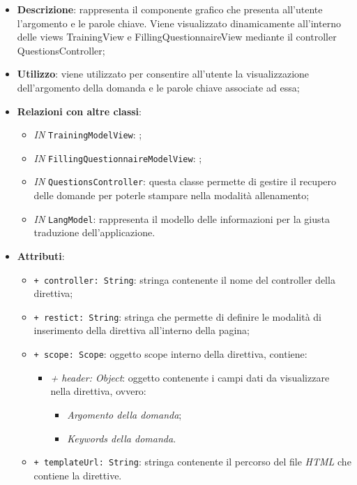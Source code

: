 		\begin{itemize}
			\item \textbf{Descrizione}: rappresenta il componente grafico che presenta all'utente l'argomento e le parole chiave. Viene visualizzato dinamicamente all'interno delle views TrainingView e FillingQuestionnaireView mediante il controller QuestionsController;
			\item \textbf{Utilizzo}: viene utilizzato per consentire all'utente la visualizzazione dell'argomento della domanda e le parole chiave associate ad essa;
			\item \textbf{Relazioni con altre classi}: 
			\begin{itemize}
				\item \textit{IN} \texttt{TrainingModelView}: ; 
				\item \textit{IN} \texttt{FillingQuestionnaireModelView}: ;
				\item \textit{IN} \texttt{QuestionsController}: questa classe permette di gestire il recupero delle domande per poterle stampare nella modalità allenamento;
				\item \textit{IN} \texttt{LangModel}: rappresenta il modello delle informazioni per la giusta traduzione dell'applicazione.
			\end{itemize}
			\item \textbf{Attributi}: 
			\begin{itemize}
				\item \texttt{+ controller: String}: stringa contenente il nome del controller della direttiva;
				\item \texttt{+ restict: String}: stringa che permette di definire le modalità di inserimento della direttiva all'interno della pagina;
				\item \texttt{+ scope: Scope}: oggetto scope interno della direttiva, contiene:
				\begin{itemize}
					\item \textit{+ header: Object}: oggetto contenente i campi dati da visualizzare nella direttiva, ovvero:
					\begin{itemize}
						\item \textit{Argomento della domanda};
						\item \textit{Keywords della domanda}.
					\end{itemize}
				\end{itemize}
				\item \texttt{+ templateUrl: String}: stringa contenente il percorso del file \textit{HTML} che contiene la direttive.
			\end{itemize}
		\end{itemize}
		
